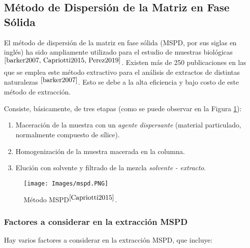 \subsection{M\'etodo de Dispersi\'on de la Matriz en Fase S\'olida}	\label{MSPD_chap}

\noindent
\justify

El m\'etodo de dispersi\'on de la matriz en fase s\'olida (MSPD, por sus siglas en ingl\'es) ha sido ampliamente utilizado para el estudio de muestras biol\'ogicas$^{\cite{barker2007, Capriotti2015, Perez2019}}$. Existen m\'as de 250 publicaciones en las que se emplea este m\'etodo extractivo para el an\'alisis de extractos de distintas naturalezas $^{\cite{barker2007}}$. Esto se debe a la alta eficiencia y bajo costo de este m\'etodo de extracci\'on. 

\noindent
\justify

Consiste, b\'asicamente, de tres etapas (como se puede observar en la Figura \ref{mspd}):

\begin{enumerate}
	\item Maceraci\'on de la muestra con un \textit{agente dispersante} (material particulado, normalmente compuesto de s\'ilice).
	\item Homogenizaci\'on de la muestra macerada en la columna.
	\item Eluci\'on con solvente y filtrado de la mezcla \textit{solvente - extracto}.
\end{enumerate}

\begin{figure}[h!]
\centering
\texttt{[image: Images/mspd.PNG]}
\caption{M\'etodo MSPD$^{\cite{Capriotti2015}}$.}
\label{mspd}
\end{figure}

\subsubsection{Factores a considerar en la extracci\'on MSPD}

\noindent
\justify

Hay varios factores a considerar en la extracci\'on MSPD, que incluye:

